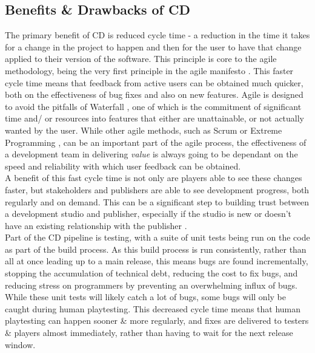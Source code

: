 \documentclass[lettersize,journal]{IEEEtran}
\begin{document}
    \subsection{Benefits \& Drawbacks of CD}
        The primary benefit of CD is reduced cycle time - a reduction in the time it takes for a change in the project to happen and then for the user to have that change applied to their version of the software. This principle is core to the agile methodology, being the very first principle in the agile manifesto \cite{agilemanifesto}. This faster cycle time means that feedback from active users can be obtained much quicker, both on the effectiveness of bug fixes and also on new features. Agile is designed to avoid the pitfalls of Waterfall \cite{royce1987managing}, one of which is the commitment of significant time and/ or resources into features that either are unattainable, or not actually wanted by the user. While other agile methods, such as Scrum or Extreme Programming \cite{cohen2004introduction,agilewithscrum}, can be an important part of the agile process, the effectiveness of a development team in delivering \textit{value} is always going to be dependant on the speed and reliability with which user feedback can be obtained. \\
        A benefit of this fast cycle time is not only are players able to see these changes faster, but stakeholders and publishers are able to see development progress, both regularly and on demand. This can be a significant step to building trust between a development studio and publisher, especially if the studio is new or doesn't have an existing relationship with the publisher \cite{gamedevhandbook}. \\
        Part of the CD pipeline is testing, with a suite of unit tests being run on the code as part of the build process. As this build process is run consistently, rather than all at once leading up to a main release, this means bugs are found incrementally, stopping the accumulation of technical debt, reducing the cost to fix bugs, and reducing stress on programmers by preventing an overwhelming influx of bugs. While these unit tests will likely catch a lot of bugs, some bugs will only be caught during human playtesting. This decreased cycle time means that human playtesting can happen sooner \& more regularly, and fixes are delivered to testers \& players almost immediately, rather than having to wait for the next release window. \\
        
\end{document}

